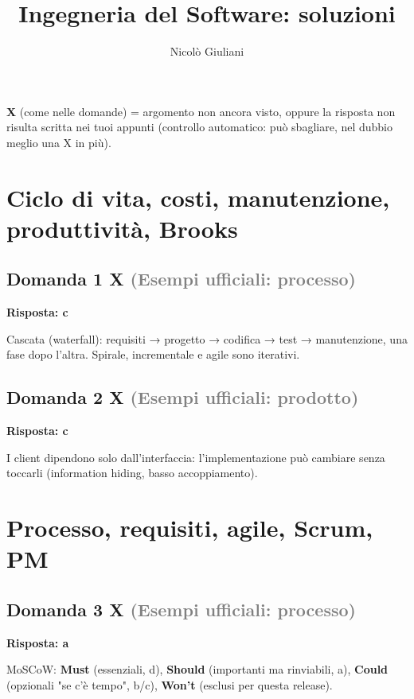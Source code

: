 \documentclass[a4paper,11pt]{article}
\title{Ingegneria del Software: soluzioni}
\author{Nicolò Giuliani}
\date{}
\begin{document}
\maketitle
\textbf{X} (come nelle domande) = argomento non ancora visto, oppure la risposta non risulta scritta nei tuoi appunti (controllo automatico: può sbagliare, nel dubbio meglio una X in più).
\bigskip
\tableofcontents
\newpage
\section{Ciclo di vita, costi, manutenzione, produttività, Brooks}

\subsection*{Domanda 1 X \hfill {\small \textcolor{gray}{(Esempi ufficiali: processo)}}}
\textbf{Risposta: c}\par
Cascata (waterfall): requisiti → progetto → codifica → test → manutenzione, una fase dopo l'altra. Spirale, incrementale e agile sono iterativi.



\subsection*{Domanda 2 X \hfill {\small \textcolor{gray}{(Esempi ufficiali: prodotto)}}}
\textbf{Risposta: c}\par
I client dipendono solo dall'interfaccia: l'implementazione può cambiare senza toccarli (information hiding, basso accoppiamento).



\section{Processo, requisiti, agile, Scrum, PM}

\subsection*{Domanda 3 X \hfill {\small \textcolor{gray}{(Esempi ufficiali: processo)}}}
\textbf{Risposta: a}\par
MoSCoW: \textbf{Must} (essenziali, d), \textbf{Should} (importanti ma rinviabili, a), \textbf{Could} (opzionali "se c'è tempo", b/c), \textbf{Won't} (esclusi per questa release).
\end{document}
